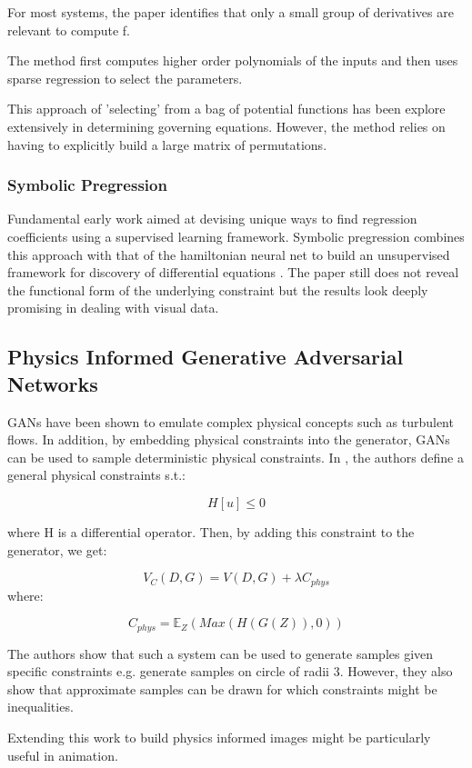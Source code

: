 \documentclass{article}
\begin{document}
 For most systems, the paper identifies that only a small group of derivatives are relevant to compute f. 
 
 The method first computes higher order polynomials of the inputs and then uses sparse regression to select the parameters. 
 
 This approach of 'selecting' from a bag of potential functions has been explore extensively in determining governing equations. However, the method relies on having to explicitly build a large matrix of permutations. 

\subsubsection{Symbolic Pregression}

Fundamental early work aimed at devising unique ways to find regression coefficients using a supervised learning framework. Symbolic pregression combines this approach with that of the hamiltonian neural net to build an unsupervised framework for discovery of differential equations \cite{udrescu_symbolic_2020}. The paper still does not reveal the functional form of the underlying constraint but the results look deeply promising in dealing with visual data.

\subsection{Physics Informed Generative Adversarial Networks}

GANs have been shown to emulate complex physical concepts such as turbulent flows. In addition, by embedding physical constraints into the generator, GANs can be used to sample deterministic physical constraints. In \cite{yang_enforcing_2019}, the authors define a general physical constraints s.t.:

$$ H[u] \leq 0$$

where H is a differential operator. Then, by adding this constraint to the generator, we get:

$$V_C(D,G) = V(D,G) + \lambda C_{phys} $$ where:

$$ C_{phys} = \mathbb{E}_{Z} (Max(H(G(Z)),0))$$

The authors show that such a system can be used to generate samples given specific constraints e.g. generate samples on  circle of radii 3. However, they also show that approximate samples can be drawn for which constraints might be inequalities. 

Extending this work to build physics informed images might be particularly useful in animation. 
\end{document}
